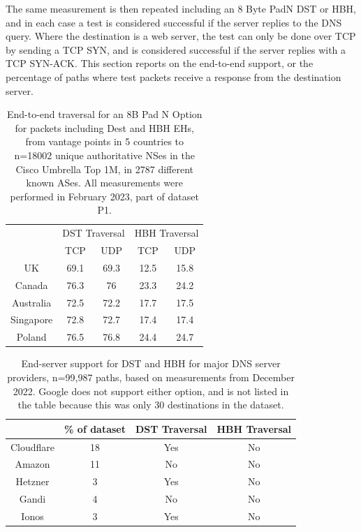 \documentclass[conference]{IEEEtran}
\begin{document}
The same measurement is then repeated including an 8 Byte PadN DST or HBH, and in each case a test is considered successful if the server replies to the DNS query. Where the destination is a web server, the test can only be done over TCP by sending a TCP SYN, and is considered successful if the server replies with a TCP SYN-ACK.
This section reports on the end-to-end support, or the percentage of paths where test packets receive a response from the destination server.

\begin{table} 
\begin{tabular}{c|cc|cc}
\multicolumn{1}{l|}{} & \multicolumn{2}{c|}{DST Traversal} & \multicolumn{2}{c}{HBH Traversal} \\ \cline{2-5} 
\multicolumn{1}{l|}{} & \multicolumn{1}{c|}{TCP}       & UDP      & \multicolumn{1}{c|}{TCP}     & UDP     \\ \hline
UK                    & \multicolumn{1}{c|}{69.1}      & 69.3    & \multicolumn{1}{c|}{12.5}    & 15.8  \\ \hline
Canada                & \multicolumn{1}{c|}{76.3}      & 76     & \multicolumn{1}{c|}{23.3}    & 24.2  \\ \hline
Australia             & \multicolumn{1}{c|}{72.5}        & 72.2      & \multicolumn{1}{c|}{17.7}    & 17.5  \\ \hline
Singapore             & \multicolumn{1}{c|}{72.8}      & 72.7    & \multicolumn{1}{c|}{17.4}    & 17.4   \\ \hline
Poland                & \multicolumn{1}{c|}{76.5}      & 76.8   & \multicolumn{1}{c|}{24.4}    & 24.7   
\end{tabular}
\label{tbl:e2e_traversal}
\caption{End-to-end traversal for an 8B Pad N Option for packets including Dest and HBH EHs, from vantage points in 5 countries to n=18002 unique authoritative NSes in the Cisco Umbrella Top 1M, in 2787 different known ASes. All measurements were performed in February 2023, part of dataset P1. }
\end{table}

\begin{table} 
\begin{tabular}{c|c|c|c}
           & \% of dataset &  DST Traversal & HBH Traversal\\
\hline
Cloudflare & 18                      & Yes                & No                 \\
\hline
Amazon     & 11                     & No                 & No                 \\
\hline
Hetzner    & 3                     & Yes                & No                 \\
\hline
Gandi      & 4                     & No                 & No                 \\
\hline
Ionos      & 3                    & Yes                & No                
\end{tabular}
\label{tbl:provider_support}
\caption{End-server support for DST and HBH for major DNS server providers, n=99,987 paths, based on measurements from December 2022. Google does not support either option, and is not listed in the table because this was only 30 destinations in the dataset.
}
\end{table}
\end{document}
